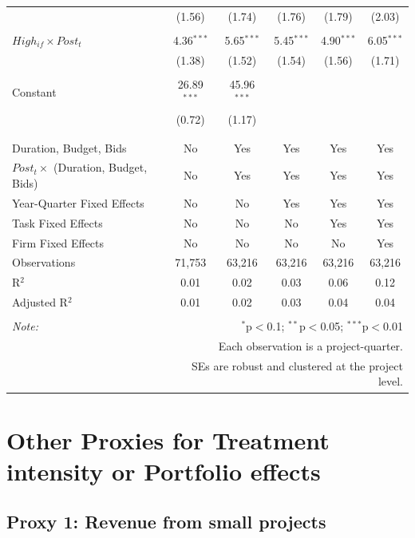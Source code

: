 \documentclass[
]{article}
\begin{document}
\begin{table}[H]
\begin{tabular}{@{\extracolsep{-2pt}}lccccc}
  & (1.56) & (1.74) & (1.76) & (1.79) & (2.03) \\ 
  & & & & & \\ 
 $High_{if} \times Post_t$ & 4.36$^{***}$ & 5.65$^{***}$ & 5.45$^{***}$ & 4.90$^{***}$ & 6.05$^{***}$ \\ 
  & (1.38) & (1.52) & (1.54) & (1.56) & (1.71) \\ 
  & & & & & \\ 
 Constant & 26.89$^{***}$ & 45.96$^{***}$ &  &  &  \\ 
  & (0.72) & (1.17) &  &  &  \\ 
  & & & & & \\ 
\hline \\[-1.8ex] 
Duration, Budget, Bids & No & Yes & Yes & Yes & Yes \\ 
$Post_t \times$  (Duration, Budget, Bids) & No & Yes & Yes & Yes & Yes \\ 
Year-Quarter Fixed Effects & No & No & Yes & Yes & Yes \\ 
Task Fixed Effects & No & No & No & Yes & Yes \\ 
Firm Fixed Effects & No & No & No & No & Yes \\ 
Observations & 71,753 & 63,216 & 63,216 & 63,216 & 63,216 \\ 
R$^{2}$ & 0.01 & 0.02 & 0.03 & 0.06 & 0.12 \\ 
Adjusted R$^{2}$ & 0.01 & 0.02 & 0.03 & 0.04 & 0.04 \\ 
\hline 
\hline \\[-1.8ex] 
\textit{Note:}  & \multicolumn{5}{r}{$^{*}$p$<$0.1; $^{**}$p$<$0.05; $^{***}$p$<$0.01} \\ 
 & \multicolumn{5}{r}{Each observation is a project-quarter.} \\ 
 & \multicolumn{5}{r}{SEs are robust and clustered at the project level.} \\ 
\end{tabular} 
\end{table}

\hypertarget{other-proxies-for-treatment-intensity-or-portfolio-effects}{%
\section{Other Proxies for Treatment intensity or Portfolio
effects}\label{other-proxies-for-treatment-intensity-or-portfolio-effects}}

\hypertarget{proxy-1-revenue-from-small-projects}{%
\subsection{Proxy 1: Revenue from small
projects}\label{proxy-1-revenue-from-small-projects}}
\end{document}
